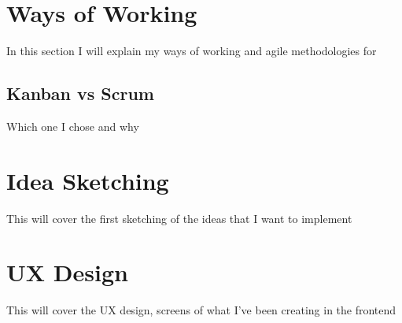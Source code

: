 \section{Ways of Working}
\label{s:Ways-of-Working}
In this section I will explain my ways of working and agile methodologies for

\subsection{Kanban vs Scrum}
\label{s:Kanban-vs-Scrum}
Which one I chose and why

\section{Idea Sketching}
\label{s:Idea-Sketching}
This will cover the first sketching of the ideas that I want to implement

\section{UX Design}
\label{s:UX-Design}
This will cover the UX design, screens of what I've been creating in the frontend

